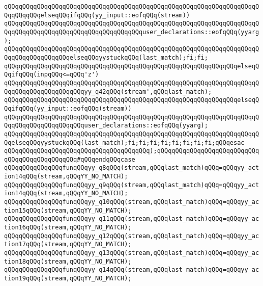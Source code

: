 \verb|qQQqqQQqqQQqqQQqqQQqqQQqqQQqqQQqqQQqqQQqqQQqqQQqqQQqqQQqqQQqqQQqqQQqqQQqqQQqqQQqelseqQQqifqQQq(yy_input::eofqQQq(stream))|\newline
\verb|qQQqqQQqqQQqqQQqqQQqqQQqqQQqqQQqqQQqqQQqqQQqqQQqqQQqqQQqqQQqqQQqqQQqqQQqqQQqqQQqqQQqqQQqqQQqqQQqqQQqqQQqqQQquser_declarations::eofqQQq(yyarg);|\newline
\verb|qQQqqQQqqQQqqQQqqQQqqQQqqQQqqQQqqQQqqQQqqQQqqQQqqQQqqQQqqQQqqQQqqQQqqQQqqQQqqQQqqQQqqQQqelseqQQqyystuckqQQq(last_match);fi;fi;|\newline
\verb|qQQqqQQqqQQqqQQqqQQqqQQqqQQqqQQqqQQqqQQqqQQqqQQqqQQqqQQqqQQqqQQqelseqQQqifqQQq(inpqQQq<=qQQq'z')|\newline
\verb|qQQqqQQqqQQqqQQqqQQqqQQqqQQqqQQqqQQqqQQqqQQqqQQqqQQqqQQqqQQqqQQqqQQqqQQqqQQqqQQqqQQqqQQqqQQqyy_q42qQQq(stream',qQQqlast_match);|\newline
\verb|qQQqqQQqqQQqqQQqqQQqqQQqqQQqqQQqqQQqqQQqqQQqqQQqqQQqqQQqqQQqqQQqelseqQQqifqQQq(yy_input::eofqQQq(stream))|\newline
\verb|qQQqqQQqqQQqqQQqqQQqqQQqqQQqqQQqqQQqqQQqqQQqqQQqqQQqqQQqqQQqqQQqqQQqqQQqqQQqqQQqqQQqqQQqqQQquser_declarations::eofqQQq(yyarg);|\newline
\verb|qQQqqQQqqQQqqQQqqQQqqQQqqQQqqQQqqQQqqQQqqQQqqQQqqQQqqQQqqQQqqQQqqQQqqQQqelseqQQqyystuckqQQq(last_match);fi;fi;fi;fi;fi;fi;fi;fi;qQQqesac|\newline
\verb|qQQqqQQqqQQqqQQqqQQqqQQqqQQqqQQqqQQqqQQq);qQQqqQQqqQQqqQQqqQQqqQQqqQQqqQQqqQQqqQQqqQQqqQQq#qQQqendqQQqcase|\newline
\verb|qQQqqQQqqQQqqQQqfunqQQqyy_q8qQQq(stream,qQQqlast_match)qQQq=qQQqyy_action14qQQq(stream,qQQqYY_NO_MATCH);|\newline
\verb|qQQqqQQqqQQqqQQqfunqQQqyy_q9qQQq(stream,qQQqlast_match)qQQq=qQQqyy_action14qQQq(stream,qQQqYY_NO_MATCH);|\newline
\verb|qQQqqQQqqQQqqQQqfunqQQqyy_q10qQQq(stream,qQQqlast_match)qQQq=qQQqyy_action15qQQq(stream,qQQqYY_NO_MATCH);|\newline
\verb|qQQqqQQqqQQqqQQqfunqQQqyy_q11qQQq(stream,qQQqlast_match)qQQq=qQQqyy_action16qQQq(stream,qQQqYY_NO_MATCH);|\newline
\verb|qQQqqQQqqQQqqQQqfunqQQqyy_q12qQQq(stream,qQQqlast_match)qQQq=qQQqyy_action17qQQq(stream,qQQqYY_NO_MATCH);|\newline
\verb|qQQqqQQqqQQqqQQqfunqQQqyy_q13qQQq(stream,qQQqlast_match)qQQq=qQQqyy_action18qQQq(stream,qQQqYY_NO_MATCH);|\newline
\verb|qQQqqQQqqQQqqQQqfunqQQqyy_q14qQQq(stream,qQQqlast_match)qQQq=qQQqyy_action19qQQq(stream,qQQqYY_NO_MATCH);|\newline
